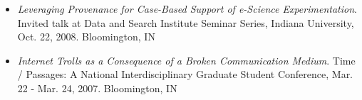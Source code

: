 \documentclass[letterpaper,11pt]{article}
\begin{document}
\begin{itemize}


\item {\it Leveraging Provenance for Case-Based Support of e-Science Experimentation}.  Invited talk at Data and Search Institute Seminar Series, Indiana University, Oct. 22, 2008.  Bloomington, IN



\item {\it Internet Trolls as a Consequence of a Broken Communication Medium}. Time / Passages: A National Interdisciplinary Graduate Student Conference, Mar. 22 - Mar. 24, 2007.  Bloomington, IN
\end{itemize}
\end{document}
